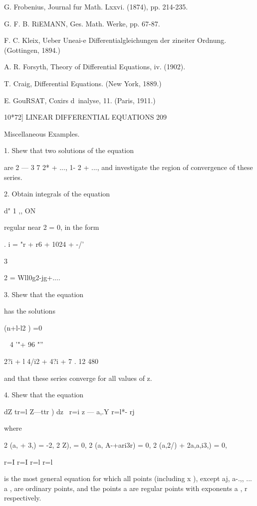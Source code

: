 G. Frobenius, Journal fur Math. Lxxvi. (1874), pp. 214-235. 

G. F. B. RiEMANN, Ges. Math. Werke, pp. 67-87. 

F. C. Kleix, Ueber Uneai-e Differentialgleichungen der zineiter Ordnung. (Gottingen, 1894.) 

A. R. Forsyth, Theory of Differential Equations, iv. (1902). 

T. Craig, Differential Equations. (New York, 1889.) 

E. GouRSAT, Coxirs d\ inalyse, 11. (Paris, 1911.) 



10*72] LINEAR DIFFERENTIAL EQUATIONS 209 

Miscellaneous Examples. 

1. Shew that two solutions of the equation 

are 2 — 3 7 2* + ..., 1- 2  + ..., and investigate the region of convergence of these series. 

2. Obtain integrals of the equation 

d"  1 ,, ON   

regular near 2 = 0, in the form 

.  i =  "r + r6 + 1024 + -/' 

3 

 2 = Wll0g2-jg+.... 

3. Shew that the equation 






has the solutions 



(n+l-l2 ) =0 



 ~ 4 '"+ 96 "'' 

2?i + l   4/i2 + 4?i + 7 . 
12   480 



and that these series converge for all values of z. 

4. Shew that the equation 

dZ  tr=l Z—ttr ) dz \ r=i z — a,.Y r=l*- rj 

where 

2 (a, + 3,) =  -2, 2 Z), = 0, 2 (a, A-+ari3r) = 0, 2 (a,2/)  + 2a,a,i3,) = 0, 

r=I r=I r=l r=l 

is the most general equation for which all points (including x ), except aj, a-.,, ... a , are 
ordinary points, and the points a  are regular points with exponents a ,  r respectively. 

